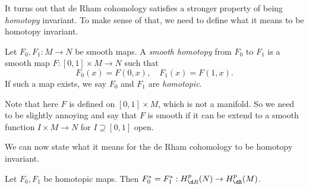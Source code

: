 \documentclass[a4paper]{article}
\begin{document}
It turns out that de Rham cohomology satisfies a stronger property of being \emph{homotopy} invariant. To make sense of that, we need to define what it means to be homotopy invariant.
\begin{defi}
  Let $F_0, F_1: M \to N$ be smooth maps. A \emph{smooth homotopy} from $F_0$ to $F_1$ is a smooth map $F: [0, 1] \times M \to N$ such that
  \[
    F_0(x) = F(0, x),\quad F_1(x) = F(1, x).
  \]
  If such a map exists, we say $F_0$ and $F_1$ are \emph{homotopic}.
\end{defi}
Note that here $F$ is defined on $[0, 1] \times M$, which is not a manifold. So we need to be slightly annoying and say that $F$ is smooth if it can be extend to a smooth function $I \times M \to N$ for $I \supseteq [0, 1]$ open.

We can now state what it means for the de Rham cohomology to be homotopy invariant.
\begin{thm}
  Let $F_0, F_1$ be homotopic maps. Then $F_0^* = F_1^*: H^p_{\d R}(N) \to H_{\dR}^p(M)$.
\end{thm}
\end{document}
